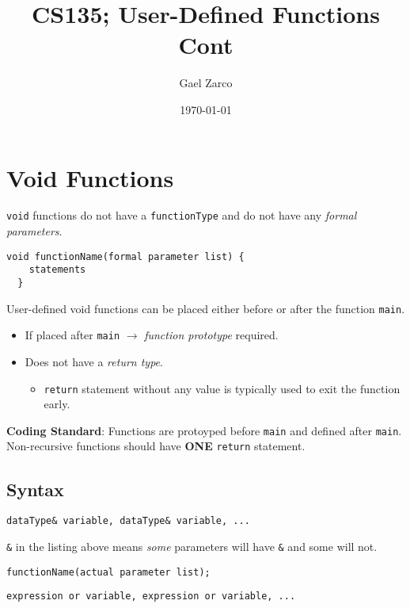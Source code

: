 \documentclass{article}
\title{CS135; User-Defined Functions Cont}
\author{Gael Zarco}
\date{\today}
\begin{document}
\maketitle

\section{Void Functions}
\texttt{void} functions do not have a \texttt{functionType} and do not have any
\textit{formal parameters}.

\begin{lstlisting}[caption={Function Definition}]
  void functionName(formal parameter list) {
    statements
  }
\end{lstlisting}

User-defined void functions can be placed either before or after the function
\texttt{main}.
\begin{itemize}
  \item If placed after \texttt{main} $\rightarrow$ \textit{function prototype}
    required.
  \item Does not have a \textit{return type}.
    \begin{itemize}
      \item \texttt{return} statement without any value is typically used to
        exit the function early.
    \end{itemize}
\end{itemize}
\textbf{Coding Standard}: Functions are protoyped before \texttt{main} and
defined after \texttt{main}. Non-recursive functions should have
\textbf{ONE} \texttt{return} statement.

\subsection{Syntax}
\begin{lstlisting}[caption={Formal Parameter List Syntax}]
  dataType& variable, dataType& variable, ...
\end{lstlisting}

\texttt{\&} in the listing above means \textit{some} parameters will have
\texttt{\&} and some will not.

\begin{lstlisting}[caption={Function Call Syntax}]
  functionName(actual parameter list);
\end{lstlisting}

\begin{lstlisting}[caption={Actual Parameter List Syntax}]
  expression or variable, expression or variable, ...
\end{lstlisting}
\end{document}
